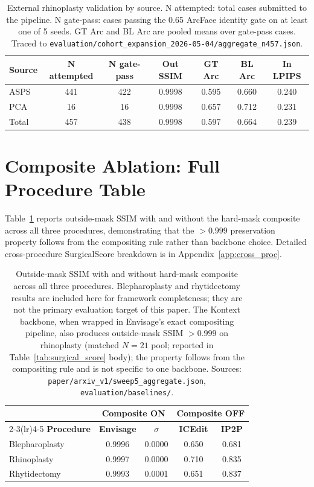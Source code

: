 \documentclass{article}
\newcommand{\method}{Envisage}
\begin{document}
\begin{table}[h]
\centering
\small
\caption{External rhinoplasty validation by source. N attempted: total cases
submitted to the pipeline. N gate-pass: cases passing the 0.65 ArcFace
identity gate on at least one of 5 seeds. GT Arc and BL Arc are pooled
means over gate-pass cases. Traced to
\texttt{evaluation/cohort\_expansion\_2026-05-04/aggregate\_n457.json}.}
\begin{tabular}{@{}lcccccc@{}}
\toprule
\textbf{Source} & \textbf{N attempted} & \textbf{N gate-pass} &
\textbf{Out SSIM} & \textbf{GT Arc} & \textbf{BL Arc} & \textbf{In LPIPS} \\
\midrule
ASPS  & 441 & 422 & 0.9998 & 0.595 & 0.660 & 0.240 \\
PCA   &  16 &  16 & 0.9998 & 0.657 & 0.712 & 0.231 \\
\midrule
Total & 457 & 438 & 0.9998 & 0.597 & 0.664 & 0.239 \\
\bottomrule
\end{tabular}
\end{table}

\section{Composite Ablation: Full Procedure Table}
\label{app:composite_full}

Table~\ref{tab:composite_full} reports outside-mask SSIM with and
without the hard-mask composite across all three procedures,
demonstrating that the $>0.999$ preservation property follows from the
compositing rule rather than backbone choice. Detailed cross-procedure
SurgicalScore breakdown is in Appendix~\ref{app:cross_proc}.

\begin{table}[h]
\centering
\small
\caption{Outside-mask SSIM with and without hard-mask composite across all three
procedures. Blepharoplasty and rhytidectomy results are included here for
framework completeness; they are not the primary evaluation target of this paper.
The Kontext backbone, when wrapped in \method{}'s exact compositing pipeline,
also produces outside-mask SSIM $>0.999$ on rhinoplasty (matched $N{=}21$ pool;
reported in Table~\ref{tab:surgical_score} body); the property follows from the
compositing rule and is not specific to one backbone.
Sources: \texttt{paper/arxiv\_v1/sweep5\_aggregate.json},
\texttt{evaluation/baselines/}.}
\label{tab:composite_full}
\begin{tabular}{lcccc}
\toprule
& \multicolumn{2}{c}{\textbf{Composite ON}} & \multicolumn{2}{c}{\textbf{Composite OFF}} \\
\cmidrule(lr){2-3}\cmidrule(lr){4-5}
\textbf{Procedure} & \textbf{Envisage} & \textbf{$\sigma$} & \textbf{ICEdit} & \textbf{IP2P} \\
\midrule
Blepharoplasty & 0.9996 & 0.0000 & 0.650 & 0.681 \\
Rhinoplasty    & 0.9997 & 0.0000 & 0.710 & 0.835 \\
Rhytidectomy   & 0.9993 & 0.0001 & 0.651 & 0.837 \\
\bottomrule
\end{tabular}
\end{table}
\end{document}
